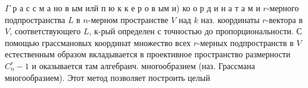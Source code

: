 \documentclass[10pt]{article}
\begin{document}
$\Gamma$ р а с с м а но в ым илй п ю к к е р о в ым и) ко о р д и н а т а м и $r$-мерного подпространства $L$ в $n$-мерном пространстве $V$ над $k$ наз. координаты $r$-вектора в $V$, соответствующего $L$, к-рый определен с точностью до пропорциональности. С помощью грассмановых координат множество всех $r$-мерных подпространств в $V$ естественным образом вкладывается в проективное пространство размерности $C_{n}^{r}-1$ и оказывается там алгебраич. многообразием (наз. Грассмана многообразием). Этот метод позволяет построить целый
\end{document}
